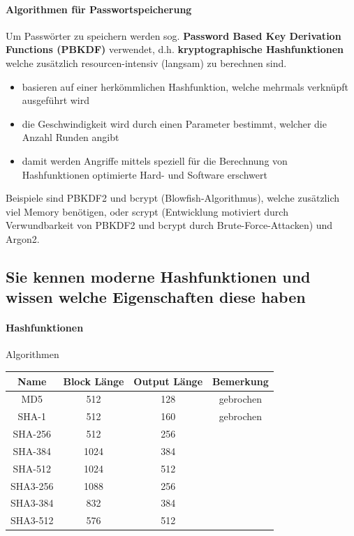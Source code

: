 \documentclass[10pt,a4paper]{article}
\begin{document}
\paragraph*{Algorithmen für Passwortspeicherung}Um Passwörter zu speichern werden sog. \textbf{Password Based Key Derivation Functions (PBKDF)} verwendet, d.h. \textbf{kryptographische Hashfunktionen} welche zusätzlich resourcen-intensiv (langsam) zu berechnen sind.
\begin{itemize}[noitemsep,topsep=0pt,leftmargin=*]
    \item basieren auf einer herkömmlichen Hashfunktion, welche mehrmals verknüpft ausgeführt wird
    \item die Geschwindigkeit wird durch einen Parameter bestimmt, welcher die Anzahl Runden angibt
    \item damit werden Angriffe mittels speziell für die Berechnung von Hashfunktionen optimierte Hard- und Software erschwert
\end{itemize}
Beispiele sind PBKDF2 und bcrypt (Blowfish-Algorithmus), welche zusätzlich viel Memory benötigen, oder scrypt (Entwicklung motiviert durch Verwundbarkeit von PBKDF2 und bcrypt durch Brute-Force-Attacken) und Argon2.

\subsection*{Sie kennen moderne Hashfunktionen und wissen welche Eigenschaften diese haben}
\paragraph*{Hashfunktionen}Algorithmen\newline
\begin{tabular}{|c|c|c|c|}
    \hline
    Name&Block Länge&Output Länge&Bemerkung\\
    \hline
    MD5&512&128&gebrochen\\
    SHA-1&512&160&gebrochen\\
    SHA-256&512&256& \\
    SHA-384&1024&384& \\
    SHA-512&1024&512& \\
    SHA3-256&1088&256& \\
    SHA3-384&832&384& \\
    SHA3-512&576&512& \\
    \hline
\end{tabular}
\end{document}
